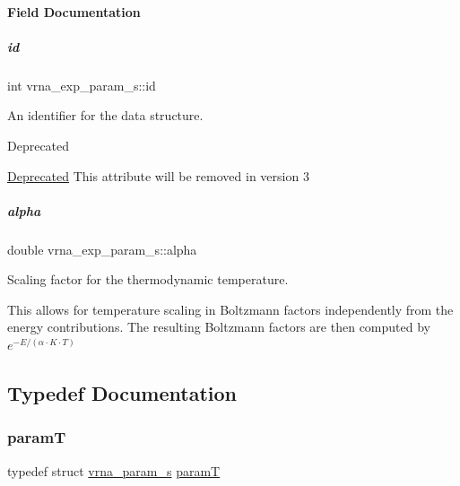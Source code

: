 \paragraph{Field Documentation}
\mbox{\label{group__energy__parameters_a378d5bcf2bae1f3ec84c912c7d3908d2}} 
\subparagraph{\texorpdfstring{id}{id}}
{\footnotesize\ttfamily int vrna\+\_\+exp\+\_\+param\+\_\+s\+::id}



An identifier for the data structure. 

\begin{DoxyRefDesc}{Deprecated}
\item[\hyperlink{deprecated__deprecated000099}{Deprecated}]This attribute will be removed in version 3 \end{DoxyRefDesc}
\mbox{\label{group__energy__parameters_a77145830b7bb01b36c3217b363310ef0}} 
\subparagraph{\texorpdfstring{alpha}{alpha}}
{\footnotesize\ttfamily double vrna\+\_\+exp\+\_\+param\+\_\+s\+::alpha}



Scaling factor for the thermodynamic temperature. 

This allows for temperature scaling in Boltzmann factors independently from the energy contributions. The resulting Boltzmann factors are then computed by $ e^{-E/(\alpha \cdot K \cdot T)} $ 

\subsection{Typedef Documentation}
\mbox{\label{group__energy__parameters_ga857dde86357d306cc902f0d8b2797659}} 
\subsubsection{\texorpdfstring{paramT}{paramT}}
{\footnotesize\ttfamily typedef struct \hyperlink{group__energy__parameters_structvrna__param__s}{vrna\+\_\+param\+\_\+s} \hyperlink{group__energy__parameters_ga857dde86357d306cc902f0d8b2797659}{paramT}}



